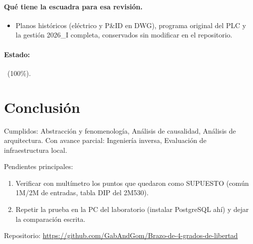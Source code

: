 \documentclass[a4paper,11pt]{article}
\begin{document}
\paragraph{Qué tiene la escuadra para esa revisión.}
\begin{itemize}
\item Planos históricos (eléctrico y P\&ID en DWG), programa original del PLC y la gestión 2026\_I completa, conservados sin modificar en el repositorio.
\end{itemize}
\paragraph{Estado:} \cumple~(100\%).
\section{Conclusión}
Cumplidos: Abstracción y fenomenología, Análisis de causalidad, Análisis de arquitectura. Con avance parcial: Ingeniería inversa, Evaluación de infraestructura local.
\par\smallskip Pendientes principales:
\begin{enumerate}
\item Verificar con multímetro los puntos que quedaron como SUPUESTO (común 1M/2M de entradas, tabla DIP del 2M530).
\item Repetir la prueba en la PC del laboratorio (instalar PostgreSQL ahí) y dejar la comparación escrita.
\end{enumerate}
\par\smallskip\noindent Repositorio: \url{https://github.com/GabAndGom/Brazo-de-4-grados-de-libertad}
\end{document}

